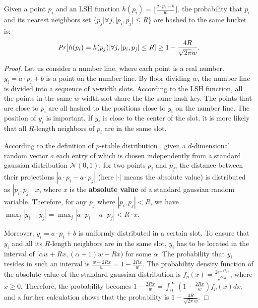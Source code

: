 \begin{lemma}
%
\label{lm:prob1}
%
Given a point $p_i$ and an LSH function $h(p_i)=\lfloor \frac{a\cdot
p_i+b}{w}\rfloor$, the probability that $p_i$ and its nearest neighbors set $\{p_j|\forall j, |p_i,p_j|\leq R\}$ are hashed to the same bucket is:
%
\begin{equation}\label{eq:lm:prob1}
%
\begin{aligned}
%
  \emph{Pr}\big[h(p_i)=h(p_{j})|\forall j, |p_i,p_j|\leq R] \geq 1-\frac{4R}{\sqrt{2\pi}w}.
%
\end{aligned}
\end{equation}
\end{lemma}
\begin{proof}

Let us consider a number line, where each point is a real number.
$y_i=a\cdot p_i+b$ is a point on the number line. By floor dividing
$w$, the number line is divided into a sequence of $w$-width slots.
According to the LSH function, all the points in the same $w$-width
slot share the the same hash key.  The points that are close to $p_i$
are all hashed to the positions close to $y_i$ on the number line.  The
position of $y_i$ is important.  If $y_i$ is close to the center of
the slot, it is more likely that all $R$-length neighbors of $p_i$
are in the same slot.

According to the definition of $p$-stable distribution
\cite{datar}, given a $d$-dimensional random
vector $a$ each entry of which is chosen independently from a standard
gaussian distribution $\mathcal{N}(0,1)$, for two points $p_i$ and
$p_j$, the distance between their projections $|a\cdot p_i-a\cdot
p_j|$ (here $|\cdot|$ means the absolute value) is distributed as $|p_i, p_j|\cdot x$, where $x$ is the \textbf{absolute
value} of a standard gaussian random variable. Therefore, for any
$p_j$ where $|p_i, p_j|<R$, we have $\max_{j}|y_i-y_j|=\max_{j}|a\cdot
p_i-a\cdot p_j|<R\cdot x$.
%

Moreover, $y_i=a\cdot p_i+b$ is uniformly distributed in a certain
slot. To ensure that $y_i$ and all its $R$-length neighbors are in
the same slot, $y_i$ has to be located in the interval of $[\alpha
w+Rx,(\alpha+1)w-Rx)$ for some $\alpha$.   The probability that $y_i$ resides in such an
interval is $\frac{w-2Rx}{w}=1-\frac{2Rx}{w}$.
%
The probability density function of the absolute value of the standard
gaussian distribution is $f_p(x)=\frac{2e^{-x^2/2}}{\sqrt{2\pi}}$,
where $x \geq 0$.  Therefore, the probability becomes
$1-\frac{2Rx}{w}=\int_{0}^{\infty}(1-\frac{2Rx}{w})f_p(x)dx$, and
a further calculation shows that the probability is
$1-\frac{4R}{\sqrt{2\pi}w}$.

\end{proof}

